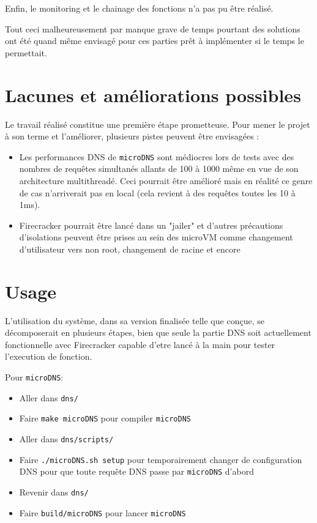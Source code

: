 \documentclass[12pt]{article}
\begin{document}
Enfin, le monitoring et le chainage des fonctions n'a pas pu être réalisé.

Tout ceci malheureusement par manque grave de temps pourtant des solutions ont été quand même envisagé pour ces parties prêt à implémenter si le temps le permettait.

\section{Lacunes et améliorations possibles}
Le travail réalisé constitue une première étape prometteuse. Pour mener le projet à son terme et l'améliorer, plusieurs pistes peuvent être envisagées :

\begin{itemize}
	\item Les performances DNS  de \texttt{microDNS} sont médiocres lors de tests avec des nombres de requêtes simultanés allants de 100 à 1000 même en vue de son architecture multithreadé. Ceci pourrait être amélioré mais en réalité ce genre de cas n'arriverait pas en local (cela revient à des requêtes toutes les 10 à 1ms).
	\item Firecracker pourrait être lancé dans un "jailer" et d'autres précautions d'isolations peuvent être prises au sein des microVM comme changement d'utilisateur vers non root, changement de racine et encore
\end{itemize}

\section{Usage}
L'utilisation du système, dans sa version finalisée telle que conçue, se décomposerait en plusieurs étapes, bien que seule la partie DNS soit actuellement fonctionnelle avec Firecracker capable d'etre lancé à la main pour tester l'execution de fonction.

Pour \texttt{microDNS}:
\begin{itemize}
	\item Aller dans \texttt{dns/}
	\item Faire \lstinline|make microDNS| pour compiler \texttt{microDNS}
	\item Aller dans \texttt{dns/scripts/}
	\item Faire \lstinline|./microDNS.sh setup| pour temporairement changer de configuration DNS pour que toute requête DNS passe par \texttt{microDNS} d'abord
	\item Revenir dans \texttt{dns/}
	\item Faire \lstinline|build/microDNS| pour lancer \texttt{microDNS}
\end{itemize}
\end{document}
